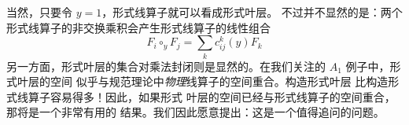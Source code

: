 当然，只要令 $y=1$，形式线算子就可以看成形式叶层。
不过并不显然的是：两个形式线算子的非交换乘积会产生形式线算子的线性组合
\begin{equation}
F_i \circ_y F_j = \sum_{k} c_{ij}^k(y) F_k
\end{equation}
另一方面，形式叶层的集合对乘法封闭则是显然的。在我们关注的 $A_1$ 例子中，形式叶层的空间
似乎与规范理论中\emph{物理}线算子的空间重合。构造形式叶层
比构造形式线算子容易得多！因此，如果形式
叶层的空间已经与形式线算子的空间重合，那将是一个非常有用的
结果。我们因此愿意提出：这是一个值得追问的问题。

